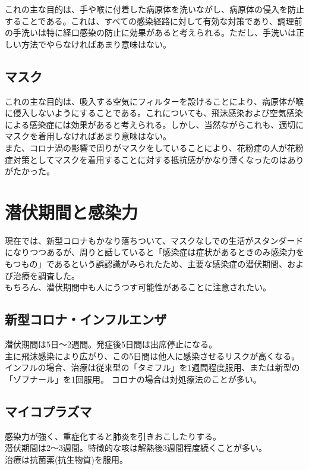 \documentclass{ltjsarticle}
\begin{document}
これの主な目的は、手や喉に付着した病原体を洗いながし、病原体の侵入を防止することである。これは、すべての感染経路に対して有効な対策であり、調理前の手洗いは特に経口感染の防止に効果があると考えられる。ただし、手洗いは正しい方法でやらなければあまり意味はない。

\subsection{マスク}

これの主な目的は、吸入する空気にフィルターを設けることにより、病原体が喉に侵入しないようにすることである。これについても、飛沫感染および空気感染による感染症には効果があると考えられる。しかし、当然ながらこれも、適切にマスクを着用しなければあまり意味はない。\\
また、コロナ渦の影響で周りがマスクをしていることにより、花粉症の人が花粉症対策としてマスクを着用することに対する抵抗感がかなり薄くなったのはありがたかった。

\section{潜伏期間と感染力}

現在では、新型コロナもかなり落ちついて、マスクなしでの生活がスタンダードになりつつあるが、周りと話していると「感染症は症状があるときのみ感染力をもつもの」であるという誤認識がみられたため、主要な感染症の潜伏期間、および治療を調査した。\\
もちろん、潜伏期間中も人にうつす可能性があることに注意されたい。

\subsection{新型コロナ・インフルエンザ}

潜伏期間は5日〜2週間。発症後5日間は出席停止になる。\\
主に飛沫感染により広がり、この5日間は他人に感染させるリスクが高くなる。\\
インフルの場合、治療は従来型の「タミフル」を1週間程度服用、または新型の「ゾフナール」を1回服用。
コロナの場合は対処療法のことが多い。

\subsection{マイコプラズマ}

感染力が強く、重症化すると肺炎を引きおこしたりする。\\
潜伏期間は2〜3週間。特徴的な咳は解熱後3週間程度続くことが多い。\\
治療は抗菌薬(抗生物質)を服用。
\end{document}
